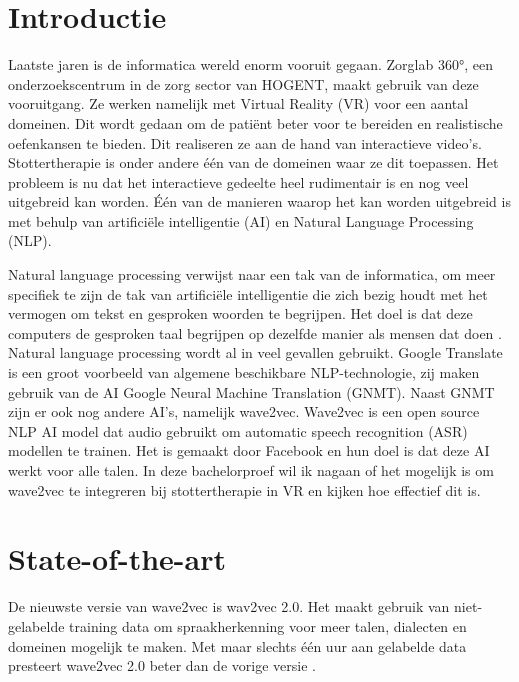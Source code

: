 
\section{Introductie}%
\label{sec:introductie}
Laatste jaren is de informatica wereld enorm vooruit gegaan. Zorglab 360°, een onderzoekscentrum in de zorg sector van HOGENT, maakt gebruik van deze vooruitgang. Ze werken namelijk met Virtual Reality (VR) voor een aantal domeinen. Dit wordt gedaan om de patiënt beter voor te bereiden en realistische oefenkansen te bieden. Dit realiseren ze aan de hand van interactieve video's. Stottertherapie is onder andere één van de domeinen waar ze dit toepassen. Het probleem is nu dat het interactieve gedeelte heel rudimentair is en nog veel uitgebreid kan worden. Één van de manieren waarop het kan worden uitgebreid is met behulp van artificiële intelligentie (AI) en Natural Language Processing (NLP). \par

Natural language processing verwijst naar een tak van de informatica, om meer specifiek te zijn de tak van artificiële intelligentie die zich bezig houdt met het vermogen om tekst en gesproken woorden te begrijpen. Het doel is dat deze computers de gesproken taal begrijpen op dezelfde manier als mensen dat doen \autocite{Education}. Natural language processing wordt al in veel gevallen gebruikt. Google Translate is een groot voorbeeld van algemene beschikbare NLP-technologie, zij maken gebruik van de AI Google Neural Machine Translation (GNMT). Naast GNMT zijn er ook nog andere AI's, namelijk wave2vec. Wave2vec is een open source NLP AI model dat audio gebruikt om automatic speech recognition (ASR) modellen te trainen. Het is gemaakt door Facebook en hun doel is dat deze AI werkt voor alle talen. In deze bachelorproef wil ik nagaan of het mogelijk is om wave2vec te integreren bij stottertherapie in VR en kijken hoe effectief dit is.



\section{State-of-the-art}%
\label{sec:state-of-the-art}
De nieuwste versie van wave2vec is wav2vec 2.0. Het maakt gebruik van niet-gelabelde training data om spraakherkenning voor meer talen, dialecten en domeinen mogelijk te maken. Met maar slechts één uur aan gelabelde data presteert wave2vec 2.0 beter dan de vorige versie \autocite{Baevski2020}.\par 


